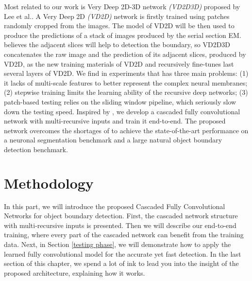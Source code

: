 \documentclass[senior]{IPSstyle}
\begin{document}
Most related to our work is Very Deep 2D-3D network \emph{(VD2D3D)} proposed by Lee et al.\cite{Lee2015}. A Very Deep 2D \emph{(VD2D)} network is firstly trained using patches randomly cropped from the images. The model of VD2D will be then used to produce the predictions of a stack of images produced by the serial section EM. \cite{Lee2015} believes the adjacent slices will help to detection the boundary, so VD2D3D concatenates the raw image and the prediction of its adjacent slices, produced by VD2D, as the new training materials of VD2D and recursively fine-tunes last several layers of VD2D.  We find in experiments that \cite{Lee2015} has three main problems: 
(1) it lacks of multi-scale features to better represent the complex neural membranes; 
(2) stepwise training limits the learning ability of the recursive deep networks; 
(3) patch-based testing relies on the sliding window pipeline, which seriously slow down the testing speed. 
Inspired by \cite{Lee2015}, we develop a cascaded fully convolutional network with multi-recursive inputs and train it end-to-end. The proposed network overcomes the shortages of \cite{Lee2015} to achieve the state-of-the-art performance on a neuronal segmentation benchmark\cite{Lee2015} and a large natural object boundary detection benchmark\cite{Ronneberger2015}.



\chapter{Methodology} \label{methodology}

In this part, we will introduce the proposed Cascaded Fully Convolutional Networks for object boundary detection. First, the cascaded network structure with multi-recursive inputs is presented. Then we will describe our end-to-end training, where every part of the cascaded network can benefit from the training data. Next, in Section \ref{testing phase}, we will demonstrate how to apply the learned fully convolutional model for the accurate yet fast detection. In the last section of this chapter, we spend a lot of ink to lead you into the insight of the proposed architecture, explaining how it works.

\end{document}

